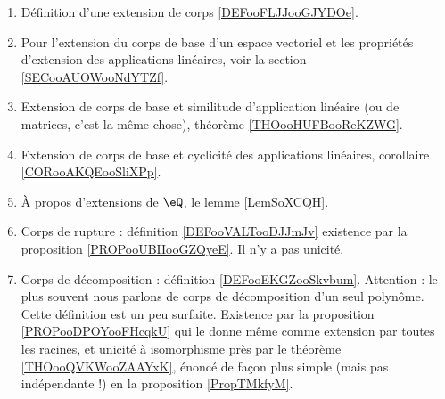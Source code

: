 
    \begin{enumerate}
        \item
            Définition d'une extension de corps \ref{DEFooFLJJooGJYDOe}.
        \item
            Pour l'extension du corps de base d'un espace vectoriel et les propriétés d'extension des applications linéaires, voir la section \ref{SECooAUOWooNdYTZf}.
        \item
            Extension de corps de base et similitude d'application linéaire (ou de matrices, c'est la même chose), théorème \ref{THOooHUFBooReKZWG}.
        \item
            Extension de corps de base et cyclicité des applications linéaires, corollaire \ref{CORooAKQEooSliXPp}.
        \item 
            À propos d'extensions de \( \eQ\), le lemme \ref{LemSoXCQH}.
        \item
            Corps de rupture : définition \ref{DEFooVALTooDJJmJv} existence par la proposition \ref{PROPooUBIIooGZQyeE}. Il n'y a pas unicité.
        \item
            Corps de décomposition : définition \ref{DEFooEKGZooSkvbum}. Attention : le plus souvent nous parlons de corps de décomposition d'un seul polynôme. Cette définition est un peu surfaite. Existence par la proposition \ref{PROPooDPOYooFHcqkU} qui le donne même comme extension par toutes les racines, et unicité à isomorphisme près par le théorème \ref{THOooQVKWooZAAYxK}, énoncé de façon plus simple (mais pas indépendante !) en la proposition \ref{PropTMkfyM}.
    \end{enumerate}

